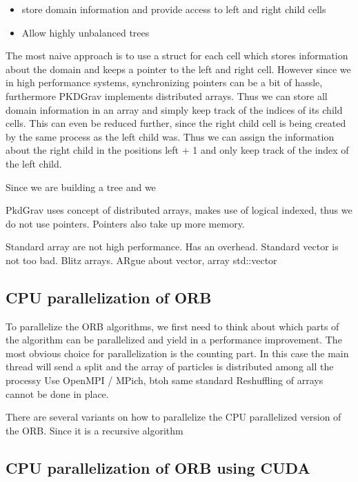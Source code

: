 \documentclass[]{article}
\begin{document}
\begin{itemize}
	\item store domain information and provide access to left and right child cells
	\item Allow highly unbalanced trees
\end{itemize}

The most naive approach is to use a struct for each cell which stores information about the domain and keeps a pointer to the left and right cell. However since we in high performance systems, synchronizing pointers can be a bit of hassle, furthermore PKDGrav implements distributed arrays. Thus we can store all domain information in an array and simply keep track of the indices of its child cells. This can even be reduced further, since the right child cell is being created by the same process as the left child was. Thus we can assign the information about the right child in the positions left + 1 and only keep track of the index of the left child.

Since we are building a tree and we 


PkdGrav uses concept of distributed arrays, makes use of logical indexed, thus we do not use pointers. Pointers also take up more memory. 

Standard array are not high performance. Has an overhead. Standard vector is not too bad. Blitz arrays. 
ARgue about vector, array std::vector

\subsection{CPU parallelization of ORB}

To parallelize the ORB algorithms, we first need to think about which parts of the algorithm can be parallelized and yield in a performance improvement. The most obvious choice for parallelization is the counting part. In this case the main thread will send a split and the array of particles is distributed among all the processy
Use OpenMPI / MPich, btoh same standard
Reshuffling of arrays cannot be done in place.

There are several variants on how to parallelize the CPU parallelized version of the ORB. Since it is a recursive algorithm 


\subsection{CPU parallelization of ORB using CUDA }


\end{document}
